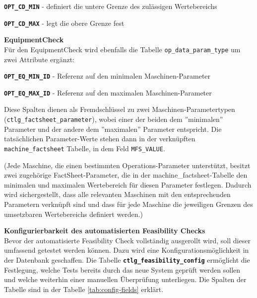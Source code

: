 \setlength{\leftskip}{1em} 
\textbf{\texttt{OPT\_CD\_MIN}} - definiert die untere Grenze des zulässigen Wertebereichs

\textbf{\texttt{OPT\_CD\_MAX}} - legt die obere Grenze fest

\setlength{\leftskip}{0em} 

\textbf{\gls{EquipmentCheck}} \\
Für den \gls{EquipmentCheck} wird ebenfalls die Tabelle \texttt{op\_data\_param\_type} um zwei Attribute ergänzt:

\setlength{\leftskip}{1em} 
\textbf{\texttt{OPT\_EQ\_MIN\_ID}} - Referenz auf den minimalen Maschinen-Parameter

\textbf{\texttt{OPT\_EQ\_MAX\_ID}} - Referenz auf den maximalen Maschinen-Parameter

\setlength{\leftskip}{0em} 

Diese Spalten dienen als Fremdschlüssel zu zwei Maschinen-Parametertypen (\texttt{ctlg\_factsheet\_parameter}), wobei einer der beiden dem ''minimalen'' Parameter und der andere dem ''maximalen'' Parameter entspricht. Die tatsächlichen Parameter-Werte stehen dann in der verknüpften \texttt{machine\_factsheet} Tabelle, in dem Feld \texttt{MFS\_VALUE}.

(Jede Maschine, die einen bestimmten Operations-Parameter unterstützt, besitzt zwei zugehörige FactSheet-Parameter, die in der machine\_factsheet-Tabelle den minimalen und maximalen Wertebereich für diesen Parameter festlegen. Dadurch wird sichergestellt, dass alle relevanten Maschinen mit den entsprechenden Parametern verknüpft sind und dass für jede Maschine die jeweiligen Grenzen des umsetzbaren Wertebereichs definiert werden.)


\textbf{Konfigurierbarkeit des automatisierten Feasibility Checks} \\
Bevor der automatisierte Feasibility Check vollständig ausgerollt wird, soll dieser umfassend getestet werden können. Dazu wird eine Konfigurationsmöglichkeit in der Datenbank geschaffen. Die Tabelle \textbf{\texttt{ctlg\_feasibility\_config}} ermöglicht die Festlegung, welche Tests bereits durch das neue System geprüft werden sollen und welche weiterhin einer manuellen Überprüfung unterliegen. Die Spalten der Tabelle sind in der Tabelle \ref{tab:config-fields} erklärt.

